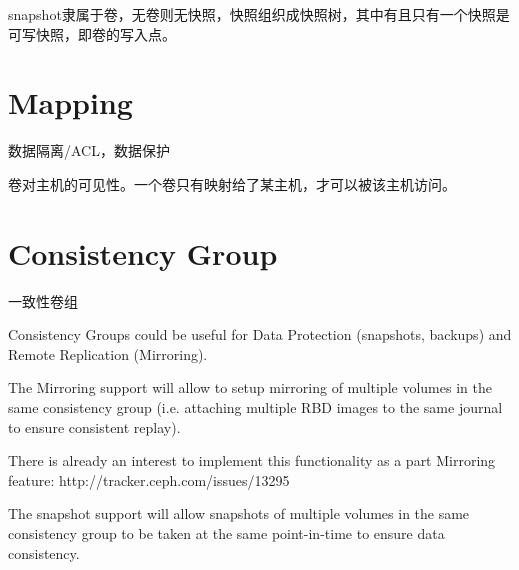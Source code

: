 snapshot隶属于卷，无卷则无快照，快照组织成快照树，其中有且只有一个快照是可写快照，即卷的写入点。

\section{Mapping}

数据隔离/ACL，数据保护

卷对主机的可见性。一个卷只有映射给了某主机，才可以被该主机访问。


\section{Consistency Group}

一致性卷组

\begin{shadequote}
Consistency Groups could be useful for Data Protection (snapshots, backups) and
Remote Replication (Mirroring).

The Mirroring support will allow to setup mirroring of multiple volumes in the
same consistency group (i.e. attaching multiple RBD images to the same journal
to ensure consistent replay).

There is already an interest to implement this functionality as a part Mirroring feature:
http://tracker.ceph.com/issues/13295

The snapshot support will allow snapshots of multiple volumes in the same
consistency group to be taken at the same point-in-time to ensure data
consistency.
\end{shadequote}
